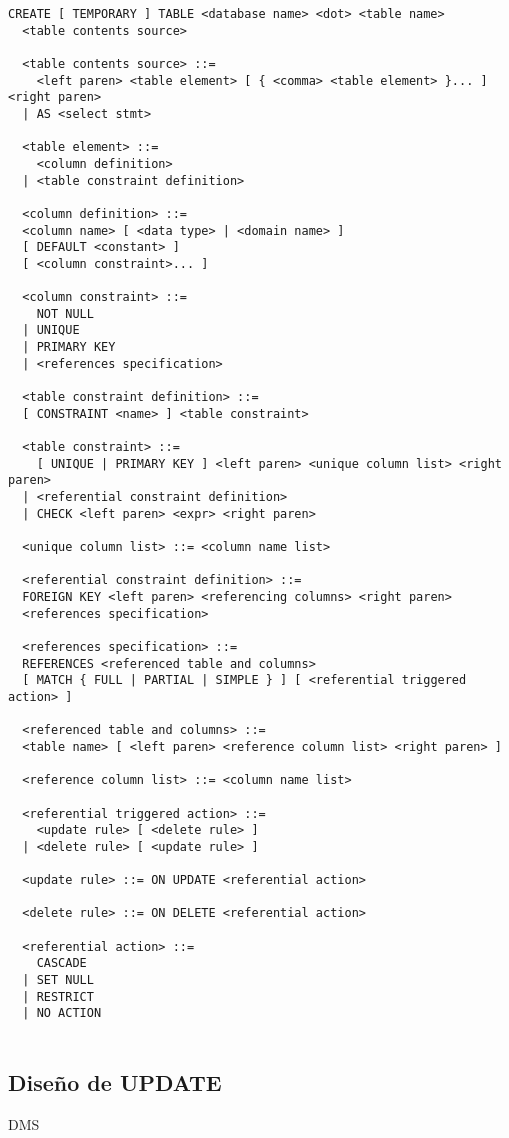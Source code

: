 \begin{Verbatim}[frame=single, label=sintaxis para CREATE TABLE]
  CREATE [ TEMPORARY ] TABLE <database name> <dot> <table name> 
  <table contents source>

  <table contents source> ::=
    <left paren> <table element> [ { <comma> <table element> }... ] <right paren>
  | AS <select stmt>
  
  <table element> ::=
    <column definition>
  | <table constraint definition>

  <column definition> ::=
  <column name> [ <data type> | <domain name> ]
  [ DEFAULT <constant> ]
  [ <column constraint>... ]
  
  <column constraint> ::=
    NOT NULL
  | UNIQUE
  | PRIMARY KEY
  | <references specification>

  <table constraint definition> ::=
  [ CONSTRAINT <name> ] <table constraint>

  <table constraint> ::=
    [ UNIQUE | PRIMARY KEY ] <left paren> <unique column list> <right paren>
  | <referential constraint definition>
  | CHECK <left paren> <expr> <right paren>

  <unique column list> ::= <column name list>

  <referential constraint definition> ::=
  FOREIGN KEY <left paren> <referencing columns> <right paren>
  <references specification>
  
  <references specification> ::=
  REFERENCES <referenced table and columns>
  [ MATCH { FULL | PARTIAL | SIMPLE } ] [ <referential triggered action> ]

  <referenced table and columns> ::=
  <table name> [ <left paren> <reference column list> <right paren> ]

  <reference column list> ::= <column name list>

  <referential triggered action> ::=
    <update rule> [ <delete rule> ]
  | <delete rule> [ <update rule> ]

  <update rule> ::= ON UPDATE <referential action>

  <delete rule> ::= ON DELETE <referential action>

  <referential action> ::=
    CASCADE
  | SET NULL
  | RESTRICT
  | NO ACTION


\end{Verbatim}




\subsection{Diseño de UPDATE}
DMS\\

